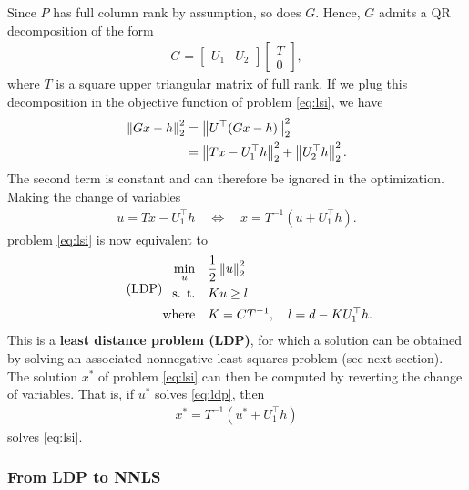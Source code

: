 \documentclass{article}
\numberwithin{equation}{section}
\theoremstyle{nonumberplain}
\begin{document}
Since $P$ has full column rank by assumption, so does $G$. Hence, $G$ admits a QR decomposition of the form
\begin{align*}
G = \begin{bmatrix}
U_1 & U_2
\end{bmatrix} \begin{bmatrix} T \\ 0 \end{bmatrix},
\end{align*}
where $T$ is a square upper triangular matrix of full rank.
If we plug this decomposition in the objective function of problem \eqref{eq:lsi}, we have
\begin{align*}
\left\|G x - h\right\|_2^2 & = \left\| U^\top(Gx-h) \right\|_2^2 \\
& = \left\| T x - U_1^\top h \right\|_2^2 + \left\|U_2^\top h\right\|_2^2.
\end{align*}
The second term is constant and can therefore be ignored in the optimization. Making the change of variables
\begin{align*}
u = T x - U_1^\top h \quad \Longleftrightarrow \quad x = T^{-1}(u + U_1^\top h).
\end{align*}
problem \eqref{eq:lsi} is now equivalent to
\begin{equation}\tag{LDP}\label{eq:ldp}
\begin{aligned}
\min_u  \quad & \frac{1}{2} \left\| u \right\|_2^2 \notag\\
\text{s. t.} \quad  & K u \geq l
\\ \text{where} \quad & K = C T^{-1}, \quad l =  d  - K U_1^\top h. \notag
\end{aligned}
\end{equation}
This is a \textbf{least distance problem (LDP)}, for which a solution can be obtained by solving an associated nonnegative least-squares problem (see next section). The solution $x^*$ of problem \eqref{eq:lsi} can then be computed by reverting the change of variables. That is, if $u^*$ solves \eqref{eq:ldp}, then
\begin{align*}
x^* = T^{-1}(u^* + U_1^\top h)
\end{align*}
solves \eqref{eq:lsi}.

\subsubsection{From LDP to NNLS}
\end{document}

